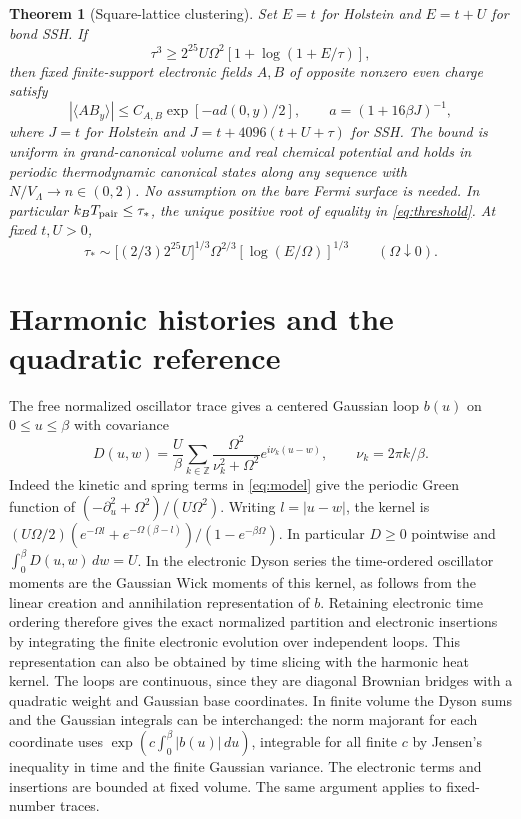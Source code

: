 \documentclass[11pt]{article}
\newtheorem{theorem}{Theorem}
\begin{document}
\begin{theorem}[Square-lattice clustering]\label{thm:clustering}
Set $E=t$ for Holstein and $E=t+U$ for bond SSH. If
\begin{equation}\label{eq:threshold}
 \tau^3\ge 2^{25}U\Omega^2[1+\log(1+E/\tau)],
\end{equation}
then fixed finite-support electronic fields $A,B$ of opposite nonzero even charge satisfy
\begin{equation}\label{eq:clustering}
 |\langle A B_y\rangle|\le C_{A,B} \exp[-a d(0,y)/2],\qquad
 a=(1+16\beta J)^{-1},
\end{equation}
where $J=t$ for Holstein and $J=t+4096(t+U+\tau)$ for SSH. The bound is uniform in grand-canonical volume and real chemical potential and holds in periodic thermodynamic canonical states along any sequence with $N/V_\Lambda\to n\in(0,2)$. No assumption on the bare Fermi surface is needed. In particular $k_BT_{\rm pair}\le\tau_*$, the unique positive root of equality in \eqref{eq:threshold}. At fixed $t,U>0$,
\begin{equation}\label{eq:asymptotic}
 \tau_*\sim \bigl[(2/3)2^{25}U\bigr]^{1/3}\Omega^{2/3}
               [\log(E/\Omega)]^{1/3}\qquad (\Omega\downarrow 0).
\end{equation}
\end{theorem}

\section{Harmonic histories and the quadratic reference}
The free normalized oscillator trace gives a centered Gaussian loop $b(u)$ on $0\le u\le\beta$ with covariance
\begin{equation}\label{eq:cov}
 D(u,w)=\frac U\beta\sum_{k\in\mathbb Z}\frac{\Omega^2}{\nu_k^2+\Omega^2}
             e^{i\nu_k(u-w)},\qquad \nu_k=2\pi k/\beta.
\end{equation}
Indeed the kinetic and spring terms in \eqref{eq:model} give the periodic Green function of $(-\partial_u^2+\Omega^2)/(U\Omega^2)$. Writing $l=|u-w|$, the kernel is $(U\Omega/2)(e^{-\Omega l}+e^{-\Omega(\beta-l)})/(1-e^{-\beta\Omega})$. In particular $D\ge 0$ pointwise and $\int_0^\beta D(u,w)\,dw=U$. In the electronic Dyson series the time-ordered oscillator moments are the Gaussian Wick moments of this kernel, as follows from the linear creation and annihilation representation of $b$. Retaining electronic time ordering therefore gives the exact normalized partition and electronic insertions by integrating the finite electronic evolution over independent loops. This representation can also be obtained by time slicing with the harmonic heat kernel. The loops are continuous, since they are diagonal Brownian bridges with a quadratic weight and Gaussian base coordinates. In finite volume the Dyson sums and the Gaussian integrals can be interchanged: the norm majorant for each coordinate uses $\exp(c\int_0^\beta |b(u)|\,du)$, integrable for all finite $c$ by Jensen's inequality in time and the finite Gaussian variance. The electronic terms and insertions are bounded at fixed volume. The same argument applies to fixed-number traces.
\end{document}
